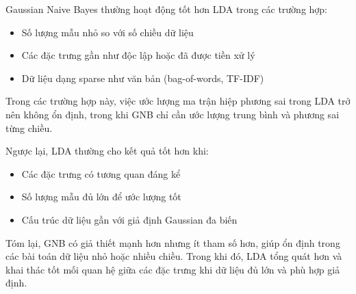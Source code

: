 Gaussian Naive Bayes thường hoạt động tốt hơn LDA trong các trường hợp:
\begin{itemize}
  \item Số lượng mẫu nhỏ so với số chiều dữ liệu
  \item Các đặc trưng gần như độc lập hoặc đã được tiền xử lý
  \item Dữ liệu dạng sparse như văn bản (bag-of-words, TF-IDF)
\end{itemize}

Trong các trường hợp này, việc ước lượng ma trận hiệp phương sai trong LDA trở
nên không ổn định, trong khi GNB chỉ cần ước lượng trung bình và phương sai
từng chiều.

Ngược lại, LDA thường cho kết quả tốt hơn khi:
\begin{itemize}
  \item Các đặc trưng có tương quan đáng kể
  \item Số lượng mẫu đủ lớn để ước lượng tốt
  \item Cấu trúc dữ liệu gần với giả định Gaussian đa biến
\end{itemize}

Tóm lại, GNB có giả thiết mạnh hơn nhưng ít tham số hơn, giúp ổn định trong
các bài toán dữ liệu nhỏ hoặc nhiều chiều. Trong khi đó, LDA tổng quát hơn và
khai thác tốt mối quan hệ giữa các đặc trưng khi dữ liệu đủ lớn và phù hợp giả
định.
